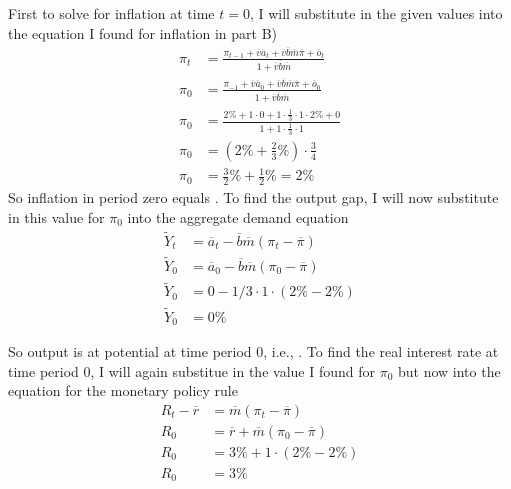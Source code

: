\begin{homeworkProblem}[2]
    First to solve for inflation at time $t=0$, I will substitute in the given values into 
    the equation I found for inflation in part B)
    \[
        \begin{split}
            \pi_t &= \frac{\pi_{t-1} + \overline{v} \overline{a}_t + \overline{v} \overline{b} \overline{m} \overline{\pi} + \overline{o}_t}{1 + \overline{v} \overline{b} \overline{m}}
            \\
            \pi_0 &= \frac{\pi_{-1} + \overline{v} \overline{a}_0 + \overline{v} \overline{b} \overline{m} \overline{\pi} + \overline{o}_0}{1 + \overline{v} \overline{b} \overline{m}}
            \\
            \pi_0 &= \frac{2\% + 1 \cdot 0 + 1 \cdot \frac{1}{3} \cdot 1 \cdot 2\% + 0}{1 + 1 \cdot \frac{1}{3} \cdot 1}
            \\
            \pi_0 &= (2\% + \frac{2}{3} \%) \cdot \frac{3}{4}
            \\
            \pi_0 &= \frac{3}{2}\% + \frac{1}{2}\% = 2 \%
        \end{split}
    \]
    So inflation in period zero equals . To find the output gap, I will
    now substitute in this value for $\pi_0$ into the aggregate demand equation
    \[
        \begin{split}
            \widetilde{Y}_t &= \overline{a}_t - \overline{b} \overline{m} (\pi_t - \overline{\pi})
            \\
            \widetilde{Y}_0 &= \overline{a}_0 - \overline{b} \overline{m} (\pi_0 - \overline{\pi})
            \\
            \widetilde{Y}_0 &= 0 - 1/3 \cdot 1 \cdot (2 \% - 2 \%)
            \\
            \widetilde{Y}_0 &= 0 \%            
        \end{split}
    \]

    So output is at potential at time period 0, i.e., . To find 
    the real interest rate at time period 0, I will again substitue in the value I found for 
    $\pi_0$ but now into the equation for the monetary policy rule
    \[
        \begin{split}
            R_t - \overline{r} &= \overline{m} (\pi_t - \overline{\pi})
            \\
            R_0 &= \overline{r} + \overline{m} (\pi_0 - \overline{\pi})
            \\
            R_0 &= 3 \% + 1 \cdot (2 \% - 2 \%)
            \\
            R_0 &= 3 \%
        \end{split}
    \]


\end{homeworkProblem}
